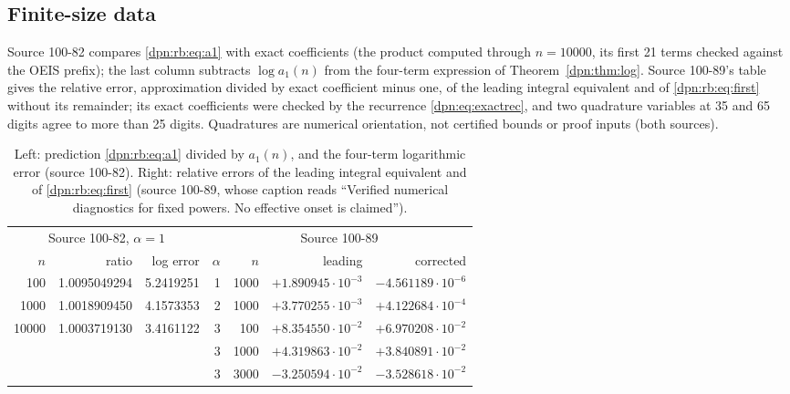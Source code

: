 \documentclass[11pt]{article}
\numberwithin{equation}{section}
\theoremstyle{definition}\newtheorem{definition}[theorem]{Definition}
\theoremstyle{remark}\newtheorem{remark}[theorem]{Remark}
\begin{document}
\subsection{Finite-size data}\label{dpn:rb:sec:numerics}
Source 100-82 compares \eqref{dpn:rb:eq:a1} with exact coefficients (the
product computed through $n=10000$, its first 21 terms checked against the
OEIS prefix); the last column subtracts $\log a_1(n)$ from the four-term
expression of Theorem~\ref{dpn:thm:log}.  Source 100-89's table gives the
relative error, approximation divided by exact coefficient minus one, of the
leading integral equivalent and of \eqref{dpn:rb:eq:first} without its
remainder; its exact coefficients were checked by the recurrence
\eqref{dpn:eq:exactrec}, and two quadrature variables at 35 and 65 digits agree
to more than 25 digits.  Quadratures are numerical orientation, not certified
bounds or proof inputs (both sources).
\begin{table}[!htbp]
\centering\small
\begin{tabular}{rrr@{\qquad}rrrr}
\toprule
\multicolumn{3}{c}{Source 100-82, $\alpha=1$} & \multicolumn{4}{c}{Source 100-89}\\
$n$ & ratio & log error & $\alpha$ & $n$ & leading & corrected\\
\midrule
100   & 1.0095049294 & 5.2419251 & 1 & 1000 & $+1.890945\cdot10^{-3}$ & $-4.561189\cdot10^{-6}$\\
1000  & 1.0018909450 & 4.1573353 & 2 & 1000 & $+3.770255\cdot10^{-3}$ & $+4.122684\cdot10^{-4}$\\
10000 & 1.0003719130 & 3.4161122 & 3 & 100  & $+8.354550\cdot10^{-2}$ & $+6.970208\cdot10^{-2}$\\
      &              &           & 3 & 1000 & $+4.319863\cdot10^{-2}$ & $+3.840891\cdot10^{-2}$\\
      &              &           & 3 & 3000 & $-3.250594\cdot10^{-2}$ & $-3.528618\cdot10^{-2}$\\
\bottomrule
\end{tabular}
\caption{Left: prediction \eqref{dpn:rb:eq:a1} divided by $a_1(n)$, and the
four-term logarithmic error (source 100-82).  Right: relative errors of the
leading integral equivalent and of \eqref{dpn:rb:eq:first} (source 100-89,
whose caption reads ``Verified numerical diagnostics for fixed powers.  No
effective onset is claimed'').}\label{dpn:rb:tab:numerics}
\end{table}
\end{document}
